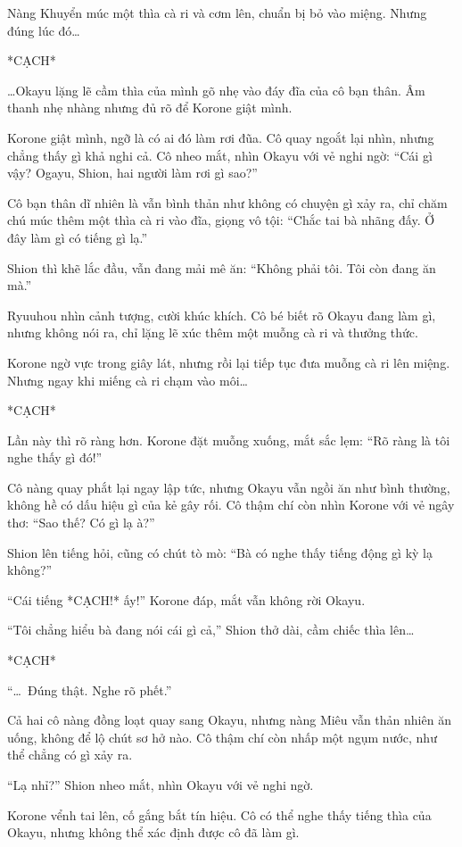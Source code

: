 \documentclass[../main.tex]{subfiles}
\begin{document}
Nàng Khuyển múc một thìa cà ri và cơm lên, chuẩn bị bỏ vào miệng. Nhưng đúng lúc đó\dots

*CẠCH*

\dots Okayu lặng lẽ cầm thìa của mình gõ nhẹ vào đáy đĩa của cô bạn thân. Âm thanh nhẹ nhàng nhưng đủ rõ để Korone giật mình.

Korone giật mình, ngỡ là có ai đó làm rơi đũa. Cô quay ngoắt lại nhìn, nhưng chẳng thấy gì khả nghi cả. Cô nheo mắt, nhìn Okayu với vẻ nghi ngờ: ``Cái gì vậy? Ogayu, Shion, hai người làm rơi gì sao?''

Cô bạn thân dĩ nhiên là vẫn bình thản như không có chuyện gì xảy ra, chỉ chăm chú múc thêm một thìa cà ri vào đĩa, giọng vô tội: ``Chắc tai bà nhãng đấy. Ở đây làm gì có tiếng gì lạ.''

Shion thì khẽ lắc đầu, vẫn đang mải mê ăn: ``Không phải tôi. Tôi còn đang ăn mà.''

Ryuuhou nhìn cảnh tượng, cười khúc khích. Cô bé biết rõ Okayu đang làm gì, nhưng không nói ra, chỉ lặng lẽ xúc thêm một muỗng cà ri và thưởng thức.

Korone ngờ vực trong giây lát, nhưng rồi lại tiếp tục đưa muỗng cà ri lên miệng. Nhưng ngay khi miếng cà ri chạm vào môi\dots

*CẠCH*

Lần này thì rõ ràng hơn. Korone đặt muỗng xuống, mắt sắc lẹm: ``Rõ ràng là tôi nghe thấy gì đó!''

Cô nàng quay phắt lại ngay lập tức, nhưng Okayu vẫn ngồi ăn như bình thường, không hề có dấu hiệu gì của kẻ gây rối. Cô thậm chí còn nhìn Korone với vẻ ngây thơ: ``Sao thế? Có gì lạ à?''

Shion lên tiếng hỏi, cũng có chút tò mò: ``Bà có nghe thấy tiếng động gì kỳ lạ không?''

``Cái tiếng *CẠCH!* ấy!'' Korone đáp, mắt vẫn không rời Okayu.

``Tôi chẳng hiểu bà đang nói cái gì cả,'' Shion thở dài, cầm chiếc thìa lên\dots

*CẠCH*

``\dots\ Đúng thật. Nghe rõ phết.''

Cả hai cô nàng đồng loạt quay sang Okayu, nhưng nàng Miêu vẫn thản nhiên ăn uống, không để lộ chút sơ hở nào. Cô thậm chí còn nhấp một ngụm nước, như thể chẳng có gì xảy ra.

``Lạ nhỉ?'' Shion nheo mắt, nhìn Okayu với vẻ nghi ngờ.

Korone vểnh tai lên, cố gắng bắt tín hiệu. Cô có thể nghe thấy tiếng thìa của Okayu, nhưng không thể xác định được cô đã làm gì.
\end{document}
